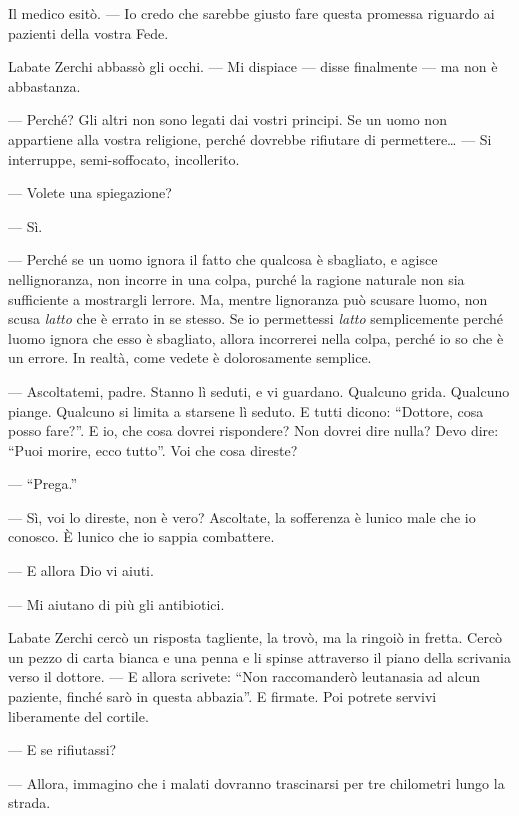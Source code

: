 Il medico esitò. --- Io credo che sarebbe giusto fare questa promessa
riguardo ai pazienti della vostra Fede.

L\textquotesingle abate Zerchi abbassò gli occhi. --- Mi dispiace ---
disse finalmente --- ma non è abbastanza.

--- Perché? Gli altri non sono legati dai vostri principi. Se un uomo
non appartiene alla vostra religione, perché dovrebbe rifiutare di
permettere\ldots{} --- Si interruppe, semi-soffocato, incollerito.

--- Volete una spiegazione?

--- Sì.

--- Perché se un uomo ignora il fatto che qualcosa è sbagliato, e agisce
nell\textquotesingle ignoranza, non incorre in una colpa, purché la
ragione naturale non sia sufficiente a mostrargli
l\textquotesingle errore. Ma, mentre l\textquotesingle ignoranza può
scusare l\textquotesingle uomo, non scusa \emph{l\textquotesingle atto}
che è errato in se stesso. Se io permettessi
\emph{l\textquotesingle atto} semplicemente perché
l\textquotesingle uomo ignora che esso è sbagliato, allora incorrerei
nella colpa, perché io so che è un errore. In realtà, come vedete è
dolorosamente semplice.

--- Ascoltatemi, padre. Stanno lì seduti, e vi guardano. Qualcuno grida.
Qualcuno piange. Qualcuno si limita a starsene lì seduto. E tutti
dicono: ``Dottore, cosa posso fare?''. E io, che cosa dovrei rispondere?
Non dovrei dire nulla? Devo dire: ``Puoi morire, ecco tutto''. Voi che
cosa direste?

--- ``Prega.''

--- Sì, voi lo direste, non è vero? Ascoltate, la sofferenza è
l\textquotesingle unico male che io conosco. È l\textquotesingle unico
che io sappia combattere.

--- E allora Dio vi aiuti.

--- Mi aiutano di più gli antibiotici.

L\textquotesingle abate Zerchi cercò un risposta tagliente, la trovò, ma
la ringoiò in fretta. Cercò un pezzo di carta bianca e una penna e li
spinse attraverso il piano della scrivania verso il dottore. --- E
allora scrivete: ``Non raccomanderò l\textquotesingle eutanasia ad alcun
paziente, finché sarò in questa abbazia''. E firmate. Poi potrete
servivi liberamente del cortile.

--- E se rifiutassi?

--- Allora, immagino che i malati dovranno trascinarsi per tre
chilometri lungo la strada.

